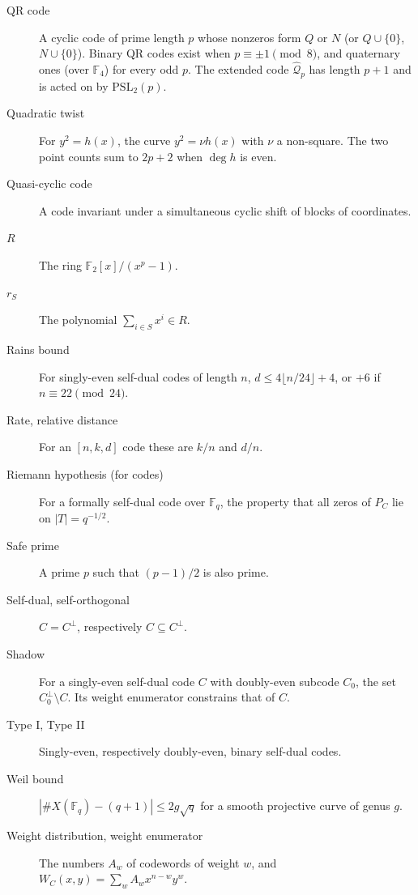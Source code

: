 \documentclass[12pt,letterpaper]{article}
\theoremstyle{definition}
\theoremstyle{remark}
\numberwithin{equation}{section}
\newcommand{\F}{\mathbb{F}}
\newcommand{\X}{\#X}
\begin{document}
\begin{description}
\item[QR code] A cyclic code of prime length $p$ whose nonzeros form $Q$ or $N$ (or
$Q\cup\{0\}$, $N\cup\{0\}$). Binary QR codes exist when $p\equiv\pm1\pmod8$, and
quaternary ones (over $\F_4$) for every odd $p$. The extended code
$\widehat{\mathcal Q}_p$ has length $p+1$ and is acted on by $\mathrm{PSL}_2(p)$.

\item[Quadratic twist] For $y^2=h(x)$, the curve $y^2=\nu h(x)$ with $\nu$ a
non-square. The two point counts sum to $2p+2$ when $\deg h$ is even.

\item[Quasi-cyclic code] A code invariant under a simultaneous cyclic shift of
blocks of coordinates.

\item[$R$] The ring $\F_2[x]/(x^p-1)$.

\item[$r_S$] The polynomial $\sum_{i\in S}x^i\in R$.

\item[Rains bound] For singly-even self-dual codes of length $n$,
$d\le4\lfloor n/24\rfloor+4$, or $+6$ if $n\equiv22\pmod{24}$.

\item[Rate, relative distance] For an $[n,k,d]$ code these are $k/n$ and $d/n$.

\item[Riemann hypothesis (for codes)] For a formally self-dual code over $\F_q$, the
property that all zeros of $P_C$ lie on $|T|=q^{-1/2}$.

\item[Safe prime] A prime $p$ such that $(p-1)/2$ is also prime.

\item[Self-dual, self-orthogonal] $C=C^\perp$, respectively $C\subseteq C^\perp$.

\item[Shadow] For a singly-even self-dual code $C$ with doubly-even subcode $C_0$,
the set $C_0^\perp\setminus C$. Its weight enumerator constrains that of $C$.

\item[Type I, Type II] Singly-even, respectively doubly-even, binary self-dual codes.

\item[Weil bound] $|\X(\F_q)-(q+1)|\le2g\sqrt q$ for a smooth projective curve of
genus $g$.

\item[Weight distribution, weight enumerator] The numbers $A_w$ of codewords of
weight $w$, and $W_C(x,y)=\sum_wA_wx^{n-w}y^w$.
\end{description}
\end{document}
